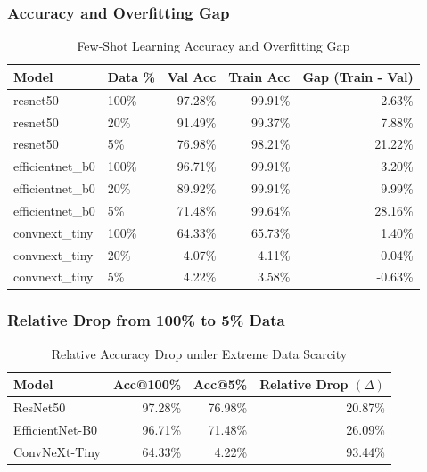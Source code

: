 \documentclass[12pt,a4paper]{article}
\begin{document}
\subsubsection{Accuracy and Overfitting Gap}

\begin{table}[H]
    \centering
    \caption{Few-Shot Learning Accuracy and Overfitting Gap}
    \begin{tabular}{llrrr}
        \toprule
        Model & Data \% & Val Acc & Train Acc & Gap (Train - Val) \\
        \midrule
        resnet50 & 100\% & 97.28\% & 99.91\% & 2.63\% \\
        resnet50 & 20\% & 91.49\% & 99.37\% & 7.88\% \\
        resnet50 & 5\% & 76.98\% & 98.21\% & 21.22\% \\
        efficientnet\_b0 & 100\% & 96.71\% & 99.91\% & 3.20\% \\
        efficientnet\_b0 & 20\% & 89.92\% & 99.91\% & 9.99\% \\
        efficientnet\_b0 & 5\% & 71.48\% & 99.64\% & 28.16\% \\
        convnext\_tiny & 100\% & 64.33\% & 65.73\% & 1.40\% \\
        convnext\_tiny & 20\% & 4.07\% & 4.11\% & 0.04\% \\
        convnext\_tiny & 5\% & 4.22\% & 3.58\% & -0.63\% \\
        \bottomrule
    \end{tabular}
\end{table}

\subsubsection{Relative Drop from 100\% to 5\% Data}
\begin{table}[H]
    \centering
    \caption{Relative Accuracy Drop under Extreme Data Scarcity}
    \begin{tabular}{lrrr}
        \toprule
        Model & Acc@100\% & Acc@5\% & Relative Drop \((\Delta)\) \\
        \midrule
        ResNet50 & 97.28\% & 76.98\% & 20.87\% \\
        EfficientNet-B0 & 96.71\% & 71.48\% & 26.09\% \\
        ConvNeXt-Tiny & 64.33\% & 4.22\% & 93.44\% \\
        \bottomrule
    \end{tabular}
\end{table}
\end{document}
